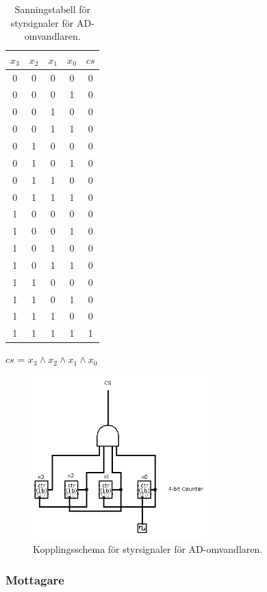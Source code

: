 \documentclass[a4paper,10pt]{article}
\begin{document}
\begin{table}[h]
\centering
\begin{tabular}{| c c c c || c |}
\hline
$x_3$ & $x_2$ & $x_1$ & $x_0$ & $cs$ \\\hline
0 & 0 & 0 & 0 & 0 \\
0 & 0 & 0 & 1 & 0 \\
0 & 0 & 1 & 0 & 0 \\
0 & 0 & 1 & 1 & 0 \\
0 & 1 & 0 & 0 & 0 \\
0 & 1 & 0 & 1 & 0 \\
0 & 1 & 1 & 0 & 0 \\
0 & 1 & 1 & 1 & 0 \\
1 & 0 & 0 & 0 & 0 \\
1 & 0 & 0 & 1 & 0 \\
1 & 0 & 1 & 0 & 0 \\
1 & 0 & 1 & 1 & 0 \\
1 & 1 & 0 & 0 & 0 \\
1 & 1 & 0 & 1 & 0 \\
1 & 1 & 1 & 0 & 0 \\
1 & 1 & 1 & 1 & 1 \\
\hline
\end{tabular}

$cs$ = $x_3 \wedge x_2 \wedge x_1 \wedge x_0$

\caption{Sanningstabell för styrsignaler för AD-omvandlaren.}
\label{tab:adc}
\end{table}

\begin{figure}[h]
\centering
\includegraphics[width=0.6\textwidth]{adccircuit.png}
\caption{Kopplingsschema för styrsignaler för AD-omvandlaren.}
\label{fig:adccircuit}
\end{figure}


\subsubsection{Mottagare}
\end{document}

